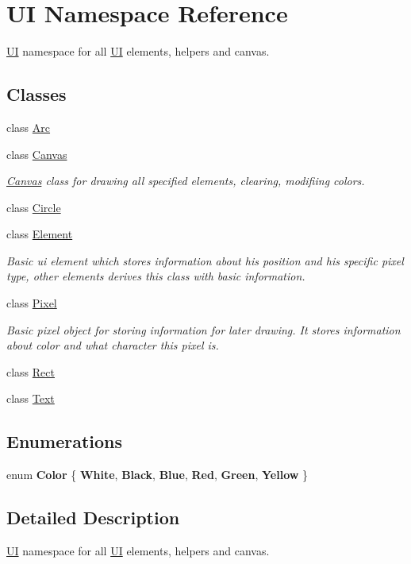 \hypertarget{namespaceUI}{}\section{UI Namespace Reference}
\label{namespaceUI}


\hyperlink{namespaceUI}{UI} namespace for all \hyperlink{namespaceUI}{UI} elements, helpers and canvas.  


\subsection*{Classes}
\begin{DoxyCompactItemize}
\item 
class \hyperlink{classUI_1_1Arc}{Arc}
\item 
class \hyperlink{classUI_1_1Canvas}{Canvas}
\begin{DoxyCompactList}\small\item\em \hyperlink{classUI_1_1Canvas}{Canvas} class for drawing all specified elements, clearing, modifiing colors. \end{DoxyCompactList}\item 
class \hyperlink{classUI_1_1Circle}{Circle}
\item 
class \hyperlink{classUI_1_1Element}{Element}
\begin{DoxyCompactList}\small\item\em Basic ui element which stores information about his position and his specific pixel type, other elements derives this class with basic information. \end{DoxyCompactList}\item 
class \hyperlink{classUI_1_1Pixel}{Pixel}
\begin{DoxyCompactList}\small\item\em Basic pixel object for storing information for later drawing. It stores information about color and what character this pixel is. \end{DoxyCompactList}\item 
class \hyperlink{classUI_1_1Rect}{Rect}
\item 
class \hyperlink{classUI_1_1Text}{Text}
\end{DoxyCompactItemize}
\subsection*{Enumerations}
\begin{DoxyCompactItemize}
\item 
\mbox{\label{namespaceUI_ae796f0fbe9bec4bcee5b6459cc96c759}} 
enum {\bfseries Color} \{ \newline
{\bfseries White}, 
{\bfseries Black}, 
{\bfseries Blue}, 
{\bfseries Red}, 
\newline
{\bfseries Green}, 
{\bfseries Yellow}
 \}
\end{DoxyCompactItemize}


\subsection{Detailed Description}
\hyperlink{namespaceUI}{UI} namespace for all \hyperlink{namespaceUI}{UI} elements, helpers and canvas. 